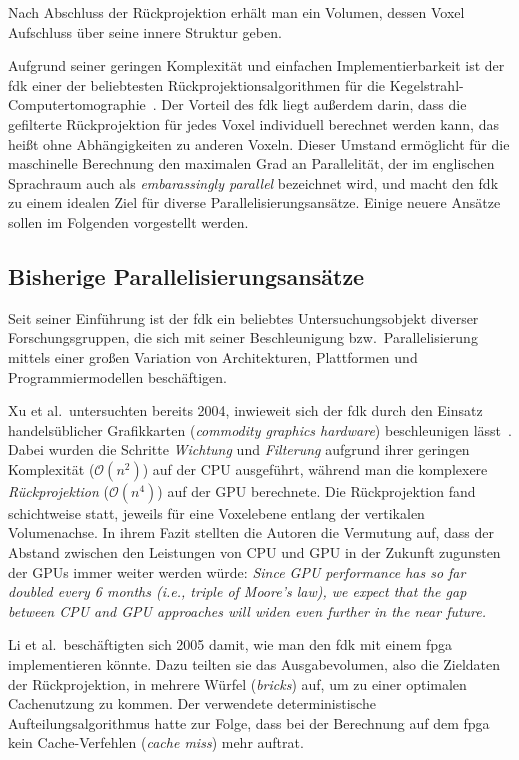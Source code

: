 Nach Abschluss der Rückprojektion erhält man ein Volumen, dessen Voxel Aufschluss über seine innere Struktur geben.

Aufgrund seiner geringen Komplexität und einfachen Implementierbarkeit ist der \gls{fdk} einer der beliebtesten
Rückprojektionsalgorithmen für die Kegelstrahl-Computertomographie~\cite{xumuell}. Der Vorteil des \gls{fdk} liegt
außerdem darin, dass die gefilterte Rückprojektion für jedes Voxel individuell berechnet werden kann, das heißt ohne
Abhängigkeiten zu anderen Voxeln. Dieser Umstand ermöglicht für die maschinelle Berechnung den maximalen Grad an
Parallelität, der im englischen Sprachraum auch als \textit{embarassingly parallel} bezeichnet wird, und macht den
\gls{fdk} zu einem idealen Ziel für diverse Parallelisierungsansätze. Einige neuere Ansätze sollen im Folgenden
vorgestellt werden.

\subsection{Bisherige Parallelisierungsansätze}

Seit seiner Einführung ist der \gls{fdk} ein beliebtes Untersuchungsobjekt diverser Forschungsgruppen, die sich mit
seiner Beschleunigung bzw.\ Parallelisierung mittels einer großen Variation von Architekturen, Plattformen und
Programmiermodellen beschäftigen. 

Xu et al.\ untersuchten bereits 2004, inwieweit sich der \gls{fdk} durch den Einsatz handelsüblicher Grafikkarten
(\textit{commodity graphics hardware}) beschleunigen lässt~\cite{xumuell}. Dabei wurden die Schritte \textit{Wichtung}
und \textit{Filterung} aufgrund ihrer geringen Komplexität ($\mathcal{O}(n^2)$) auf der CPU ausgeführt, während man die
komplexere \textit{Rückprojektion} ($\mathcal{O}(n^4)$) auf der GPU berechnete. Die Rückprojektion fand schichtweise
statt, jeweils für eine Voxelebene entlang der vertikalen Volumenachse. In ihrem Fazit stellten die Autoren die
Vermutung auf, dass der Abstand zwischen den Leistungen von CPU und GPU in der Zukunft zugunsten der GPUs immer weiter
werden würde: \textit{Since GPU performance has so far doubled every 6 months (i.e., triple of Moore's law), we expect
that the gap between CPU and GPU approaches will widen even further in the near future.}

Li et al.\ beschäftigten sich 2005 damit, wie man den \gls{fdk} mit einem \gls{fpga} implementieren könnte. Dazu teilten
sie das Ausgabevolumen, also die Zieldaten der Rückprojektion, in mehrere Würfel (\textit{bricks}) auf, um zu einer
optimalen Cachenutzung zu kommen. Der verwendete deterministische Aufteilungsalgorithmus hatte zur Folge, dass bei der
Berechnung auf dem \gls{fpga} kein Cache-Verfehlen (\textit{cache miss}) mehr auftrat.


